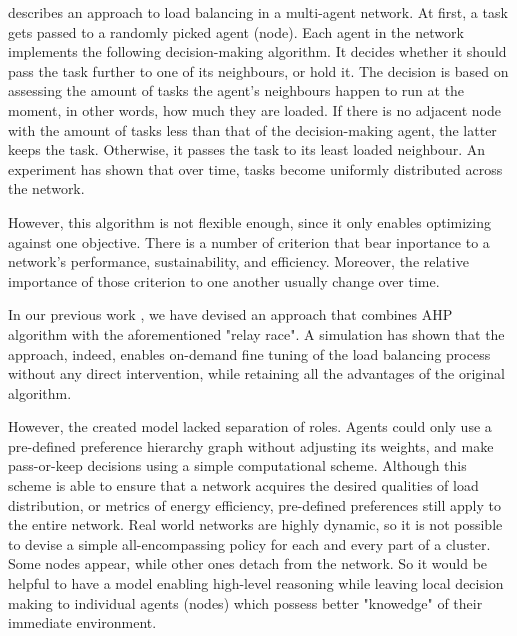 \cite{gorodetskii-2012} describes an approach to load balancing in a multi-agent network.
At first, a task gets passed to a randomly picked agent (node).
Each agent in the network implements the following decision-making algorithm.
It decides whether it should pass the task further to one of its neighbours, or hold it.
The decision is based on assessing the amount of tasks the agent's neighbours happen to run at the moment, in other words, how much they are loaded.
If there is no adjacent node with the amount of tasks less than that of the decision-making agent, the latter keeps the task.
Otherwise, it passes the task to its least loaded neighbour.
An experiment has shown that over time, tasks become uniformly distributed across the network.

However, this algorithm is not flexible enough, since it only enables optimizing against one objective.
There is a number of criterion that bear inportance to a network's performance, sustainability, and efficiency.
Moreover, the relative importance of those criterion to one another usually change over time.

In our previous work \cite{murashov-2022}, we have devised an approach that combines AHP algorithm with the aforementioned "relay race".
A simulation has shown that the approach, indeed, enables on-demand fine tuning of the load balancing process without any direct intervention, while retaining all the advantages of the original algorithm.

However, the created model lacked separation of roles.
Agents could only use a pre-defined preference hierarchy graph without adjusting its weights, and make pass-or-keep decisions using a simple computational scheme.
Although this scheme is able to ensure that a network acquires the desired qualities of load distribution, or metrics of energy efficiency, pre-defined preferences still apply to the entire network.
Real world networks are highly dynamic, so it is not possible to devise a simple all-encompassing policy for each and every part of a cluster.
Some nodes appear, while other ones detach from the network.
So it would be helpful to have a model enabling high-level reasoning while leaving local decision making to individual agents (nodes) which possess better "knowedge" of their immediate environment.
